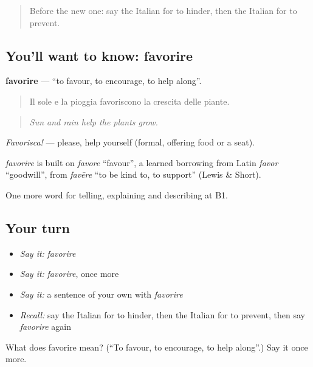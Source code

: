 \begin{quote}
Before the new one: say the Italian for to hinder, then the Italian for to prevent.
\end{quote}

\subsection*{You'll want to know: favorire}
\textbf{favorire} — \textquotedblleft{}to favour, to encourage, to help along\textquotedblright{}.

\begin{quote}
Il sole e la pioggia favoriscono la crescita delle piante.
\end{quote}

\begin{quote}
\emph{Sun and rain help the plants grow.}
\end{quote}

\emph{Favorisca!} — please, help yourself (formal, offering food or a seat).

\begin{cousinweb}
\emph{favorire} is built on \emph{favore} \textquotedblleft{}favour\textquotedblright{}, a learned borrowing from Latin \emph{favor} \textquotedblleft{}goodwill\textquotedblright{}, from \emph{favēre} \textquotedblleft{}to be kind to, to support\textquotedblright{} (Lewis \& Short).
\end{cousinweb}

\begin{grammarlens}[title={What you've built}]
One more word for telling, explaining and describing at B1.
\end{grammarlens}

\subsection*{Your turn}
\begin{itemize}
\raggedright
  \item \emph{Say it:} \emph{favorire}
  \item \emph{Say it:} \emph{favorire}, once more
  \item \emph{Say it:} a sentence of your own with \emph{favorire}
  \item \emph{Recall:} say the Italian for to hinder, then the Italian for to prevent, then say \emph{favorire} again
\end{itemize}

\begin{tcolorbox}[breakable,colback=teal!4,colframe=teal!35!black,title={Before you move on}]
What does favorire mean? (\textquotedblleft{}To favour, to encourage, to help along\textquotedblright{}.) Say it once more.
\end{tcolorbox}
